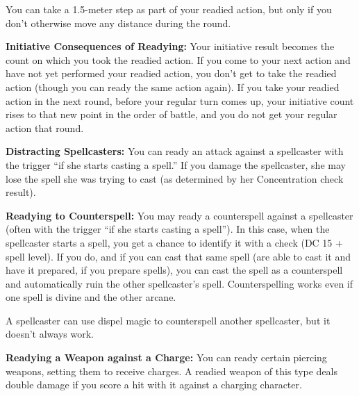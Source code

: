 You can take a 1.5-meter step as part of your readied action, but only if you don't otherwise move any distance during the round.

\textbf{Initiative Consequences of Readying:} Your initiative result becomes the count on which you took the readied action. If you come to your next action and have not yet performed your readied action, you don't get to take the readied action (though you can ready the same action again). If you take your readied action in the next round, before your regular turn comes up, your initiative count rises to that new point in the order of battle, and you do not get your regular action that round.

\textbf{Distracting Spellcasters:} You can ready an attack against a spellcaster with the trigger ``if she starts casting a spell.'' If you damage the spellcaster, she may lose the spell she was trying to cast (as determined by her Concentration check result).

\textbf{Readying to Counterspell:} You may ready a counterspell against a spellcaster (often with the trigger ``if she starts casting a spell''). In this case, when the spellcaster starts a spell, you get a chance to identify it with a  check (DC 15 + spell level). If you do, and if you can cast that same spell (are able to cast it and have it prepared, if you prepare spells), you can cast the spell as a counterspell and automatically ruin the other spellcaster's spell. Counterspelling works even if one spell is divine and the other arcane.

A spellcaster can use dispel magic to counterspell another spellcaster, but it doesn't always work.

\textbf{Readying a Weapon against a Charge:} You can ready certain piercing weapons, setting them to receive charges. A readied weapon of this type deals double damage if you score a hit with it against a charging character.